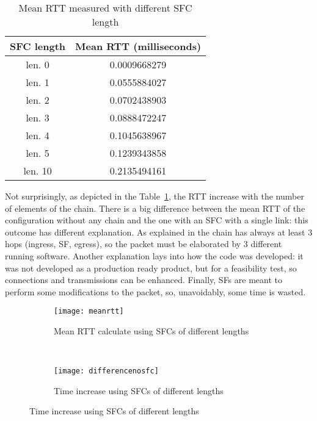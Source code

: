 \begin{table}[H]
\centering
\begin{tabular}{@{}cc@{}}
\toprule
\textbf{SFC length} & \textbf{Mean RTT (milliseconds)} \\ \midrule
len. 0              & 0.0009668279      \\
len. 1              & 0.0555884027      \\
len. 2              & 0.0702438903      \\
len. 3              & 0.0888472247      \\
len. 4              & 0.1045638967      \\
len. 5              & 0.1239343858      \\
len. 10             & 0.2135494161      \\ \bottomrule
\end{tabular}
\caption{Mean RTT measured with different SFC length}
\label{chap:tests:sec:rtt:tab:meanrtt}
\end{table}

Not surprisingly, as depicted in the Table~\ref{chap:tests:sec:rtt:tab:meanrtt},
the RTT increase with the number of elements of the chain. There is a big
difference between the mean RTT of the configuration without any chain and the
one with an SFC with a single link: this outcome has different explanation. As
explained in  the chain has always at
least 3 hops (ingress, SF, egress), so the packet must be elaborated by 3
different running software. Another explanation lays into how the code was
developed: it was not developed as a production ready product, but for a
feasibility test, so connections and transmissions can be enhanced. Finally, SFs
are meant to perform some modifications to the packet, so, unavoidably, some
time is wasted. 

\begin{figure}[H]
    \begin{subfigure}[b]{0.45\textwidth}
        \texttt{[image: meanrtt]}
        \caption{Mean RTT calculate using SFCs of different lengths}
        \label{chap:tests:sec:rtt:img:meanstt}
    \end{subfigure}
    ~
    \begin{subfigure}[b]{0.45\textwidth}
        \texttt{[image: differencenosfc]}
        \caption{Time increase using SFCs of different lengths}
        \label{chap:tests:sec:rtt:img:differencertt}
    \end{subfigure}
\end{figure}

